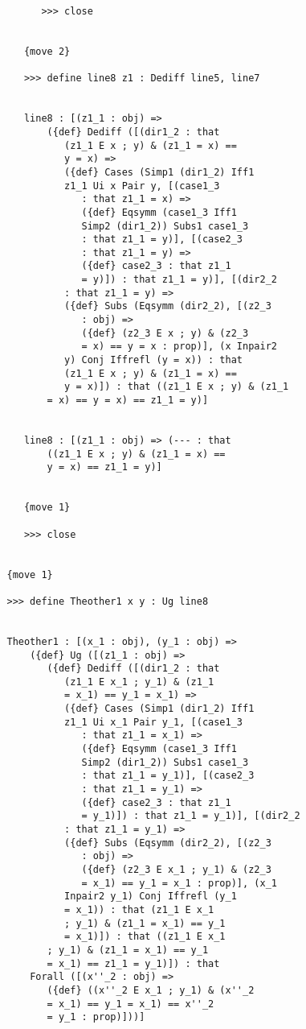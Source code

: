 \documentclass[12pt]{article}
\begin{document}
\begin{verbatim}
         >>> close


      {move 2}

      >>> define line8 z1 : Dediff line5, line7


      line8 : [(z1_1 : obj) => 
          ({def} Dediff ([(dir1_2 : that 
             (z1_1 E x ; y) & (z1_1 = x) == 
             y = x) => 
             ({def} Cases (Simp1 (dir1_2) Iff1 
             z1_1 Ui x Pair y, [(case1_3 
                : that z1_1 = x) => 
                ({def} Eqsymm (case1_3 Iff1 
                Simp2 (dir1_2)) Subs1 case1_3 
                : that z1_1 = y)], [(case2_3 
                : that z1_1 = y) => 
                ({def} case2_3 : that z1_1 
                = y)]) : that z1_1 = y)], [(dir2_2 
             : that z1_1 = y) => 
             ({def} Subs (Eqsymm (dir2_2), [(z2_3 
                : obj) => 
                ({def} (z2_3 E x ; y) & (z2_3 
                = x) == y = x : prop)], (x Inpair2 
             y) Conj Iffrefl (y = x)) : that 
             (z1_1 E x ; y) & (z1_1 = x) == 
             y = x)]) : that ((z1_1 E x ; y) & (z1_1 
          = x) == y = x) == z1_1 = y)]


      line8 : [(z1_1 : obj) => (--- : that 
          ((z1_1 E x ; y) & (z1_1 = x) == 
          y = x) == z1_1 = y)]


      {move 1}

      >>> close


   {move 1}

   >>> define Theother1 x y : Ug line8


   Theother1 : [(x_1 : obj), (y_1 : obj) => 
       ({def} Ug ([(z1_1 : obj) => 
          ({def} Dediff ([(dir1_2 : that 
             (z1_1 E x_1 ; y_1) & (z1_1 
             = x_1) == y_1 = x_1) => 
             ({def} Cases (Simp1 (dir1_2) Iff1 
             z1_1 Ui x_1 Pair y_1, [(case1_3 
                : that z1_1 = x_1) => 
                ({def} Eqsymm (case1_3 Iff1 
                Simp2 (dir1_2)) Subs1 case1_3 
                : that z1_1 = y_1)], [(case2_3 
                : that z1_1 = y_1) => 
                ({def} case2_3 : that z1_1 
                = y_1)]) : that z1_1 = y_1)], [(dir2_2 
             : that z1_1 = y_1) => 
             ({def} Subs (Eqsymm (dir2_2), [(z2_3 
                : obj) => 
                ({def} (z2_3 E x_1 ; y_1) & (z2_3 
                = x_1) == y_1 = x_1 : prop)], (x_1 
             Inpair2 y_1) Conj Iffrefl (y_1 
             = x_1)) : that (z1_1 E x_1 
             ; y_1) & (z1_1 = x_1) == y_1 
             = x_1)]) : that ((z1_1 E x_1 
          ; y_1) & (z1_1 = x_1) == y_1 
          = x_1) == z1_1 = y_1)]) : that 
       Forall ([(x''_2 : obj) => 
          ({def} ((x''_2 E x_1 ; y_1) & (x''_2 
          = x_1) == y_1 = x_1) == x''_2 
          = y_1 : prop)]))]



\end{verbatim}
\end{document}
